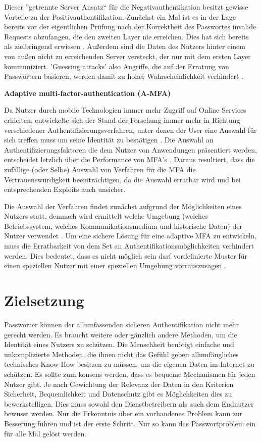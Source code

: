 Dieser ''getrennte Server Ansatz`` für die Negativauthentikation besitzt gewisse Vorteile zu der Positivauthentifikation. Zunächst ein Mal ist es in der Lage bereits vor der eigentlichen Prüfung nach der Korrektheit des Passwortes invalide Requests abzufangen, die den zweiten Layer nie erreichen. Dies hat sich bereits als zielbringend erwiesen \cite{A14}. Außerdem sind die Daten des Nutzers hinter einem von außen nicht zu erreichenden Server versteckt, der nur mit dem ersten Layer kommuniziert. 'Guessing attacks' also Angriffe, die auf der Erratung von Passwörtern basieren, werden damit zu hoher Wahrscheinlichkeit verhindert \cite{A11}.

\textbf{Adaptive multi-factor-authentication (A-MFA)}

Da Nutzer durch mobile Technologien immer mehr Zugriff auf Online Services erhielten, entwickelte sich der Stand der Forschung immer mehr in Richtung verschiedener Authentifizierungsverfahren, unter denen der User eine Auswahl für sich treffen muss um seine Identität zu bestätigen \cite{A11}. Die Auswahl an Authentifizierungsfaktoren die dem Nutzer von Anwendungen präsentiert werden, entscheidet letzlich über die Performance von MFA's \cite{A11}. Daraus resultiert, dass die zufällige (oder Selbe) Auswahl von Verfahren für die MFA die Vertrauenswürdigkeit beeinträchtigen, da die Auswahl erratbar wird und bei entsprechenden Exploits auch unsicher. 

Die Auswahl der Verfahren findet zunächst aufgrund der Möglichkeiten eines Nutzers statt, demnach wird ermittelt welche Umgebung (welches Betriebssystem, welches Kommunikationsmedium und historische Daten) der Nutzer verwendet \cite{A15}. Um eine sichere Lösung für eine adaptive MFA zu entwickeln, muss die Erratbarkeit von dem Set an Authentifikationsmöglichkeiten verhindert werden. Dies bedeutet, dass es nicht möglich sein darf vordefinierte Muster für einen speziellen Nutzer mit einer speziellen Umgebung vorrauszusagen \cite{11}.
\newpage

\section{Zielsetzung}
Passwörter können der allumfassenden sicheren Authentifikation nicht mehr gerecht werden. Es braucht weitere oder gänzlich andere Methoden, um die Identität eines Nutzers zu schützen. Die Menschheit benötigt einfache und unkomplizierte Methoden, die ihnen nicht das Gefühl geben allumfängliches technisches Know-How besitzen zu müssen, um die eigenen Daten im Internet zu schützen. Es sollte zum konsens werden, dass es bequeme Mechanismen für jeden Nutzer gibt. Je nach Gewichtung der Relevanz der Daten in den Kriterien Sicherheit, Bequemlichkeit und Datenschutz gibt es Möglichkeiten dies zu bewerkstelligen. Dies muss sowohl den Dienstbetreibern als auch dem Endnutzer bewusst werden. Nur die Erkenntnis über ein vorhandenes Problem kann zur Besserung führen und ist der erste Schritt. Nur so kann das Passwortproblem ein für alle Mal gelöst werden.

